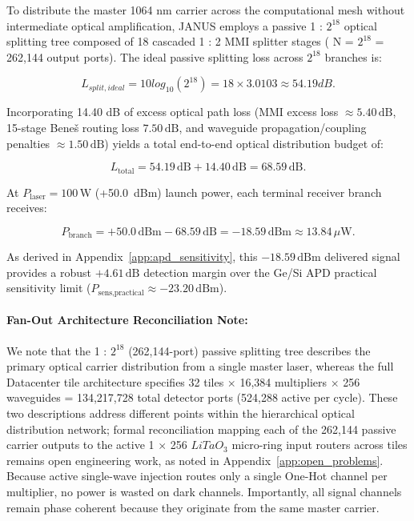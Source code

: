 \documentclass[journal]{IEEEtran}
\begin{document}
To distribute the master 1064 nm carrier across the computational mesh without intermediate optical amplification, JANUS employs a passive
1 : $2^{18}$ optical splitting tree composed of 18 cascaded 1 : 2 MMI splitter stages ( N = $2^{18}$ = 262,144 output ports). The ideal passive splitting loss across $2^{18}$ branches is:

\begin{equation}
L_{split,ideal} = 10 log_{10}(2^{18}) = 18 \times 3.0103 \approx 54.19 dB.
\end{equation}

Incorporating 14.40 dB of excess optical path loss (MMI excess loss $\approx 5.40\,\text{dB}$, 15-stage Beneš routing loss $7.50\,\text{dB}$, and waveguide propagation/coupling penalties $\approx 1.50\,\text{dB}$) yields a total end-to-end optical distribution budget of:

\begin{equation}
L_{\text{total}} = 54.19\,\text{dB} + 14.40\,\text{dB} = 68.59\,\text{dB}.
\end{equation}

At $P_{\text{laser}} = 100\,\text{W}$ (+50.0~dBm) launch power, each terminal receiver branch receives:

\begin{equation}
P_{\text{branch}} = +50.0\,\text{dBm} - 68.59\,\text{dB} = -18.59\,\text{dBm} \approx 13.84\,\mu\text{W}.
\end{equation}

As derived in Appendix~\ref{app:apd_sensitivity}, this $-18.59\,\text{dBm}$ delivered signal provides a robust $+4.61\,\text{dB}$ detection margin over the Ge/Si APD practical sensitivity limit ($P_{\text{sens,practical}} \approx -23.20\,\text{dBm}$).

\paragraph{\textbf{Fan-Out Architecture Reconciliation Note:}}

We note that the 1 : $2^{18}$ (262,144-port) passive splitting tree describes the primary optical carrier distribution from a single master laser, whereas the full Datacenter tile architecture specifies 32 tiles $\times$ 16,384 multipliers $\times$ 256 waveguides = 134,217,728 total detector ports (524,288 active per cycle). These two descriptions address different points within the hierarchical optical distribution network; formal reconciliation mapping each of the 262,144 passive carrier outputs to the active 1 $\times$ 256 $LiTaO_3$ micro-ring input routers across tiles remains open engineering work, as noted in Appendix~\ref{app:open_problems}. Because active single-wave injection routes only a single One-Hot channel per multiplier, no power is wasted on dark channels. Importantly, all signal channels remain phase coherent because they originate from the same master carrier.
\end{document}
